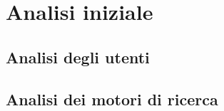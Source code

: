 \section{Analisi iniziale}

\subsection{Analisi degli utenti}

\subsection{Analisi dei motori di ricerca}